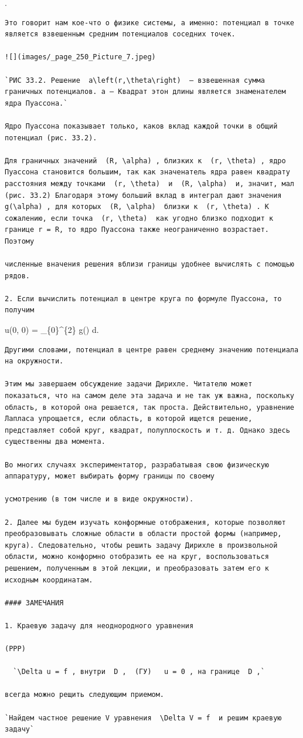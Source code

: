 \documentclass[
  ukrainian,
]{article}
\begin{document}
.

\begin{verbatim}
Это говорит нам кое-что о физике системы, а именно: потенциал в точке является взвешенным средним потенциалов соседних точек.

![](images/_page_250_Picture_7.jpeg)

`РИС 33.2. Решение  a\left(r,\theta\right)  — взвешенная сумма граничных потенциалов. a — Квадрат этон длины является знаменателем ядра Пуассона.`

Ядро Пуассона показывает только, каков вклад каждой точки в общий потенциал (рис. 33.2).

Для граничных значений  (R, \alpha) , близких к  (r, \theta) , ядро Пуассона становится большим, так как значенатель ядра равен квадрату расстояния между точками  (r, \theta)  и  (R, \alpha)  и, значит, мал (рис. 33.2) Благодаря этому больший вклад в интеграл дают значения  g(\alpha) , для которых  (R, \alpha)  близки к  (r, \theta) . К сожалению, если точка  (r, \theta)  как угодно близко подходит к границе r = R, то ядро Пуассона также неограниченно возрастает. Поэтому

численные вначения решения вблизи границы удобнее вычислять с помощью рядов.

2. Если вычислить потенциал в центре круга по формуле Пуассона, то получим
\end{verbatim}

u(0, 0) =  \int\_\{0\}\^{}\{2\pi\} g(\alpha) d\alpha.

\begin{verbatim}
Другими словами, потенциал в центре равен среднему значению потенциала на окружности.

Этим мы завершаем обсуждение задачи Дирихле. Читателю может показаться, что на самом деле эта задача и не так уж важна, поскольку область, в которой она решается, так проста. Действительно, уравнение Лапласа упрощается, если область, в которой ищется решение, представляет собой круг, квадрат, полуплоскость и т. д. Однако здесь существенны два момента.

Во многих случаях экспериментатор, разрабатывая свою физическую аппаратуру, может выбирать форму границы по своему

усмотрению (в том числе и в виде окружности).

2. Далее мы будем изучать конформные отображения, которые позволяют преобразовывать сложные области в области простой формы (например, круга). Следовательно, чтобы решить задачу Дирихле в произвольной области, можно конформно отобразить ее на круг, воспользоваться решением, полученным в этой лекции, и преобразовать затем его к исходным координатам.

#### ЗАМЕЧАНИЯ

1. Краевую задачу для неоднородного уравнения

(PPP)

  `\Delta u = f , внутри  D ,  (ГУ)   u = 0 , на границе  D ,`

всегда можно рещить следующим приемом.

`Найдем частное решение V уравнения  \Delta V = f  и решим краевую задачу`
\end{verbatim}
\end{document}
